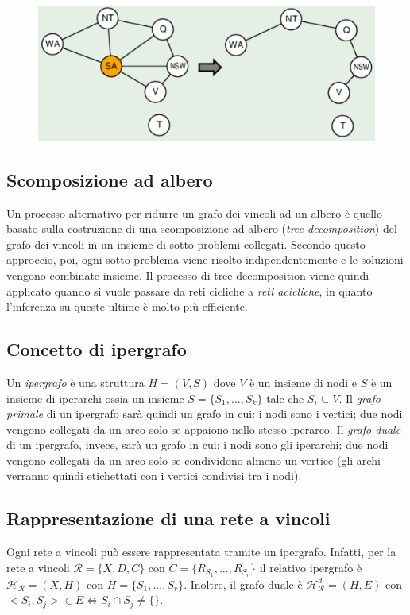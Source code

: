 \documentclass[11pt,oneside]{book}
\begin{document}
\begin{figure}[htp]
	\centering
	\includegraphics[width=\textwidth, height=\textheight, keepaspectratio]{cycle-cutset.png}
\end{figure}

\subsection{Scomposizione ad albero}
Un processo alternativo per ridurre un grafo dei vincoli ad un albero è quello basato sulla costruzione di una scomposizione ad albero (\textit{tree decomposition}) del grafo dei vincoli in un insieme di sotto-problemi collegati. Secondo questo approccio, poi, ogni sotto-problema viene risolto indipendentemente e le soluzioni vengono combinate insieme. Il processo di tree decomposition viene quindi applicato quando si vuole passare da reti cicliche a \textit{reti acicliche}, in quanto l'inferenza su queste ultime è molto più efficiente.

\subsection{Concetto di ipergrafo}
Un \textit{ipergrafo} è una struttura $H = (V, S)$ dove $V$ è un insieme di nodi e $S$ è un insieme di iperarchi ossia un insieme $S = \{ S_1, ..., S_k \}$ tale che $S_i \subseteq V$. Il \textit{grafo primale} di un ipergrafo sarà quindi un grafo in cui: i nodi sono i vertici; due nodi vengono collegati da un arco solo se appaiono nello stesso iperarco. Il \textit{grafo duale} di un ipergrafo, invece, sarà un grafo in cui: i nodi sono gli iperarchi; due nodi vengono collegati da un arco solo se condividono almeno un vertice (gli archi verranno quindi etichettati con i vertici condivisi tra i nodi).

\subsection{Rappresentazione di una rete a vincoli}
Ogni rete a vincoli può essere rappresentata tramite un ipergrafo. Infatti, per la rete a vincoli $\mathcal{R} = \{ X, D, C \}$ con $C = \{ R_{S_1}, ..., R_{S_r} \}$ il relativo ipergrafo è $\mathcal{H}_\mathcal{R} = (X,H)$ con $H = \{ S_1, ..., S_r \}$. Inoltre, il grafo duale è $\mathcal{H}_\mathcal{R}^d = (H,E)$ con $<S_i, S_j> \in E \iff S_i \cap S_j \neq \{ \}$.
\end{document}
